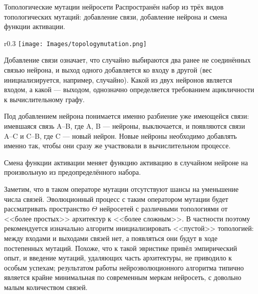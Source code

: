 \begin{exampleBox}[label=ex:wannmutations]{Топологические мутации нейросети}
Распространён набор из трёх видов топологических мутаций: добавление связи, добавление нейрона и смена функции активации. 

\begin{wrapfigure}{r}{0.3\textwidth}
\centering
\vspace{-0.5cm}
\texttt{[image: Images/topologymutation.png]}
\vspace{-1cm}
\end{wrapfigure}

Добавление связи означает, что случайно выбираются два ранее не соединённых связью нейрона, и выход одного добавляется ко входу в другой (вес инициализируется, например, случайно). Какой из двух нейронов является входом, а какой --- выходом, однозначно определяется требованием ацикличности к вычислительному графу.

Под добавлением нейрона понимается именно разбиение уже имеющейся связи: имевшаяся связь A--B, где A, B --- нейроны, выключается, и появляются связи A--C и C--B, где C --- новый нейрон. Новые нейроны необходимо добавлять именно так, чтобы они сразу же участвовали в вычислительном процессе. 

Смена функции активации меняет функцию активацию в случайном нейроне на произвольную из предопределённого набора.

\begin{remark}
Заметим, что в таком операторе мутации отсутствуют шансы на уменьшение числа связей. Эволюционный процесс с таким оператором мутации будет рассматривать пространство $\Theta$ нейросетей с различными топологиями от <<более простых>> архитектур к <<более сложным>>. В частности поэтому рекомендуется изначально алгоритм инициализировать <<пустой>> топологией: между входами и выходами связей нет, а появляться они будут в ходе постепенных мутаций. Похоже, что к такой эвристике привёл эмпирический опыт, и введение мутаций, удаляющих часть архитектуры, не приводило к особым успехам; результатом работы нейроэволюционного алгоритма типично является крайне минимальная по современным меркам нейросеть, с довольно малым количеством связей.
\end{remark}
\end{exampleBox}

